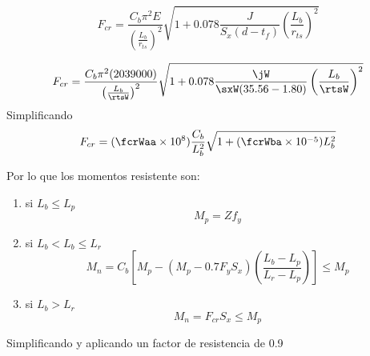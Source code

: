 \documentclass[11pt,a4paper]{article}
\begin{document}
\begin{equation}
	F_{cr}=\frac{C_b\pi^2E}{\left(\frac{L_b}{r_{ts}}\right)^2}\sqrt{1+0.078\frac{J}{S_x(d-t_f)}\left(\frac{L_b}{r_{ts}}\right)^2}
\end{equation}

\begin{align*}
	 F_{cr}=\frac{C_b\pi^2(\Ey)}{\left(\frac{L_b}{\rtsW}\right)^2}\sqrt{1+0.078\frac{\jW}{\sxW(\dW-\tfW)}\left(\frac{L_b}{\rtsW}\right)^2}
\end{align*}
Simplificando
\begin{align*}
	 F_{cr}=(\fcrWaa \times 10^8) \frac{C_b}{L_b^2}\sqrt{1+(\fcrWba\times 10^{-5}) L_b^2}
\end{align*}

Por lo que los momentos resistente son:

\begin{enumerate}
\item si $L_b\leq L_p$
\begin{equation} 
	M_p=Zf_y
\end{equation}

\item si $L_b<L_b\leq L_r$
\begin{equation} 
	M_n=C_b \left[ M_p-(M_p-0.7F_y S_x) \left( \frac{L_b-L_p}{L_r-L_p} \right) \right] \leq M_p
\end{equation}

\item si $L_b> L_r$
\begin{equation}
	M_n=F_{cr} S_x \leq M_p
\end{equation} 
\end{enumerate}

Simplificando y aplicando un factor de resistencia de 0.9

\end{document}
